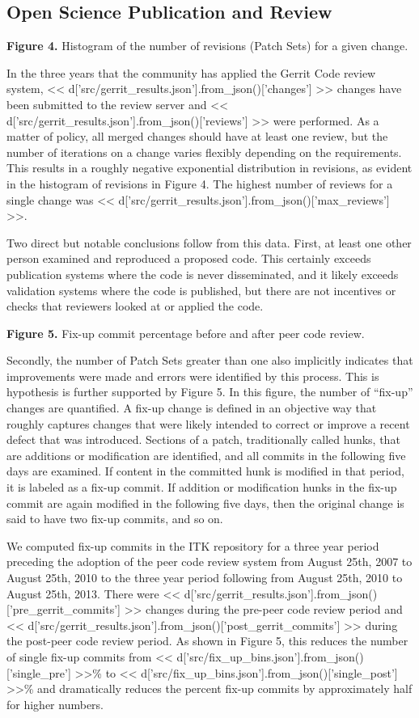 \documentclass{frontiersENG} %
\begin{document}
\subsection{Open Science Publication and Review}

\textbf{Figure 4. }{Histogram of the number of revisions (Patch Sets) for a
given change.}\label{fig:04}

In the three years that the community has applied the Gerrit Code review
system, << d['src/gerrit_results.json'].from_json()['changes'] >> changes have
been submitted to the review server and
<< d['src/gerrit_results.json'].from_json()['reviews'] >> were performed.
As a matter of policy, all merged changes should have at least one review,
but the number of iterations on a change varies flexibly depending on the
requirements. This results in a roughly negative exponential distribution in
revisions, as evident in the histogram of revisions in
Figure 4.  The highest number of reviews
for a single change was
<< d['src/gerrit_results.json'].from_json()['max_reviews'] >>.

Two direct but notable conclusions follow from this data. First, at least one
other person examined and reproduced a proposed code.  This certainly exceeds
publication systems where the code is never disseminated, and it likely
exceeds validation systems where the code is published, but there are not
incentives or checks that reviewers looked at or applied the code.

\textbf{Figure 5. }{Fix-up commit percentage before and after peer code review.}
\label{fig:05}

Secondly, the number of Patch Sets greater than one also implicitly indicates that
improvements were made and errors were identified by this process.  This is
hypothesis is further supported by Figure 5.  In this
figure, the number of ``fix-up'' changes are quantified. A fix-up change is
defined in an objective way that roughly captures changes that were likely
intended to correct or improve a recent defect that was introduced.  Sections
of a patch, traditionally called hunks, that are additions or modification are
identified, and all commits in the following five days are examined.  If
content in the committed hunk is modified in that period, it is labeled as
a fix-up commit.  If addition or modification hunks in the fix-up commit are again
modified in the following five days, then the original change is said to have
two fix-up commits, and so on.

We computed fix-up commits in the ITK repository for a three year period
preceding the adoption of the peer code review system from August 25th, 2007
to August 25th, 2010 to the three year period following from August 25th, 2010
to August 25th, 2013.  There were
<< d['src/gerrit_results.json'].from_json()['pre_gerrit_commits'] >>
changes during the pre-peer code review period and
<< d['src/gerrit_results.json'].from_json()['post_gerrit_commits'] >>
during the post-peer code review period.  As shown in
Figure 5, this reduces the number of
single fix-up commits from <<
d['src/fix_up_bins.json'].from_json()['single_pre'] >>\%
to << d['src/fix_up_bins.json'].from_json()['single_post'] >>\% and
dramatically reduces the percent fix-up commits by approximately half for
higher numbers.
\end{document}
